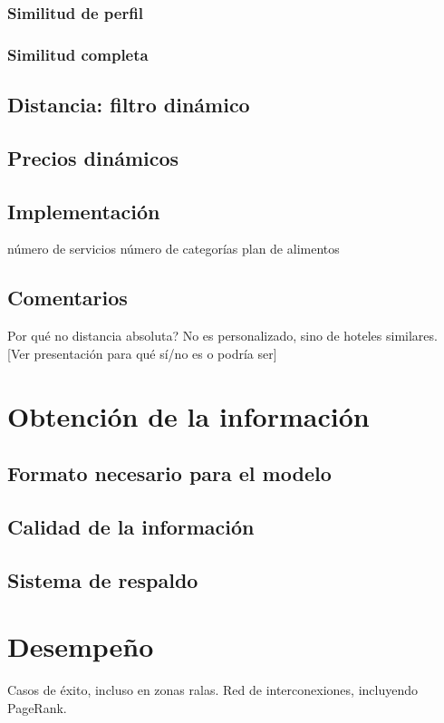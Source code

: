 \documentclass[12pt]{report}
\begin{document}
\subsection*{Similitud de perfil}
\subsection*{Similitud completa}
\section{Distancia: filtro dinámico}
\section{Precios dinámicos}
\section{Implementación}
número de servicios
número de categorías
plan de alimentos
\section{Comentarios}
Por qué no distancia absoluta?
No es personalizado, sino de hoteles similares.
[Ver presentación para qué sí/no es o podría ser]

\chapter{Obtención de la información}
\section{Formato necesario para el modelo}
\section{Calidad de la información}
\section{Sistema de respaldo}

\chapter{Desempeño}
Casos de éxito, incluso en zonas ralas.
Red de interconexiones, incluyendo PageRank.
\end{document}

